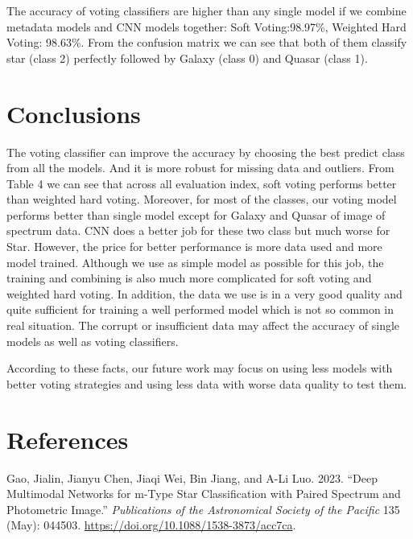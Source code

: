 \documentclass[
  11pt,
]{article}
\newlength{\cslhangindent}
\newlength{\cslentryspacingunit} %
\newenvironment{CSLReferences}[2] %
 {%
  \setlength{\parindent}{0pt}
  \ifodd #1
  \let\oldpar\par
  \def\par{\hangindent=\cslhangindent\oldpar}
  \fi
  \setlength{\parskip}{#2\cslentryspacingunit}
 }%
 {}
\begin{document}
The accuracy of voting classifiers are higher than any single model if we combine metadata models and CNN models together: Soft Voting:98.97\%, Weighted Hard Voting: 98.63\%. From the confusion matrix we can see that both of them classify star (class 2) perfectly followed by Galaxy (class 0) and Quasar (class 1).

\hypertarget{conclusions}{%
\section{Conclusions}\label{conclusions}}

The voting classifier can improve the accuracy by choosing the best predict class from all the models. And it is more robust for missing data and outliers. From Table 4 we can see that across all evaluation index, soft voting performs better than weighted hard voting. Moreover, for most of the classes, our voting model performs better than single model except for Galaxy and Quasar of image of spectrum data. CNN does a better job for these two class but much worse for Star.
However, the price for better performance is more data used and more model trained. Although we use as simple model as possible for this job, the training and combining is also much more complicated for soft voting and weighted hard voting. In addition, the data we use is in a very good quality and quite sufficient for training a well performed model which is not so common in real situation. The corrupt or insufficient data may affect the accuracy of single models as well as voting classifiers.

According to these facts, our future work may focus on using less models with better voting strategies and using less data with worse data quality to test them.

\newpage

\hypertarget{references}{%
\section{References}\label{references}}

\hypertarget{refs}{}
\begin{CSLReferences}{1}{0}
\leavevmode{}%
Gao, Jialin, Jianyu Chen, Jiaqi Wei, Bin Jiang, and A-Li Luo. 2023. {``Deep Multimodal Networks for m-Type Star Classification with Paired Spectrum and Photometric Image.''} \emph{Publications of the Astronomical Society of the Pacific} 135 (May): 044503. \url{https://doi.org/10.1088/1538-3873/acc7ca}.

\end{CSLReferences}
\end{document}
